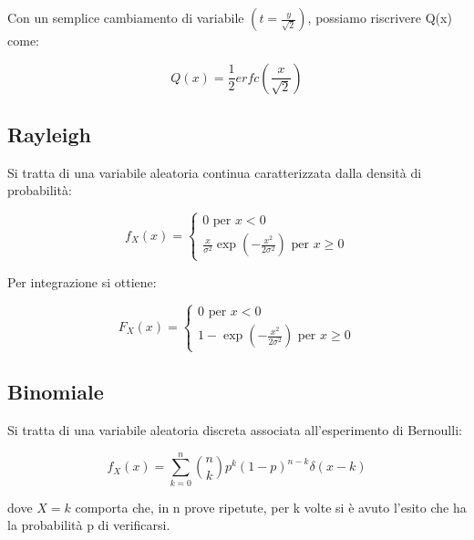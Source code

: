 Con un semplice cambiamento di variabile $(t = \frac{y}{\sqrt{2}})$, possiamo riscrivere Q(x) come: 

{
    \Large 
    \begin{equation}
        Q (x) = \frac{1}{2} erfc(\frac{x}{\sqrt{2}})
    \end{equation}
} 


\subsection{Rayleigh} 

Si tratta di una variabile aleatoria continua caratterizzata dalla densità di probabilità: 

{
    \Large 
    \begin{equation}
        f_X (x) 
        = 
        \begin{cases}
            0 \text{ per } x < 0 \\
            \frac{x}{\sigma ^{2}} \exp(- \frac{x^{2}}{2 \sigma ^{2}}) \text{ per } x \geq 0
        \end{cases}
    \end{equation}
}

Per integrazione si ottiene: 

{
    \Large 
    \begin{equation}
        F_X (x) = 
        \begin{cases}
            0 \text{ per } x < 0 \\ 
            1 - \exp (- \frac{x^{2}}{2 \sigma^{2}}) \text{ per } x \geq 0
        \end{cases}
    \end{equation}
}

\subsection{Binomiale} 

Si tratta di una variabile aleatoria discreta associata all'esperimento di Bernoulli: 

{
    \Large 
    \begin{equation}
        f_X (x) 
        = 
        \sum_{k = 0}^{n}
        \binom{n}{k}
        p^{k}
        (1 - p)^{n - k}
        \delta(x - k)
    \end{equation}
}

dove $X = k$ comporta che, in n prove ripetute, per k volte si è avuto l'esito che ha la probabilità p di verificarsi. \newline 

